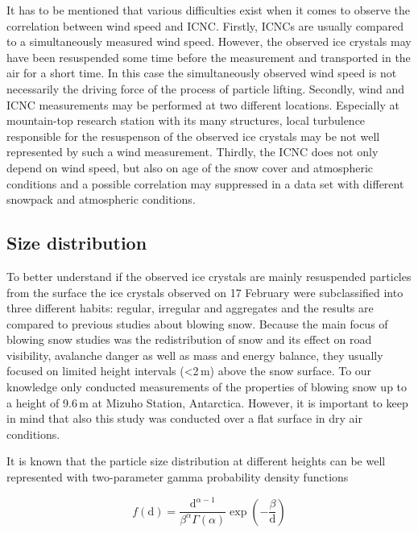 \documentclass[draft,linenumbers]{agujournal}
\begin{document}
It has to be mentioned that various difficulties exist when it comes to observe the correlation between wind speed and ICNC. Firstly, ICNCs are usually compared to a simultaneously measured wind speed. However, the observed ice crystals may have been resuspended some time before the measurement and transported in the air for a short time. In this case the simultaneously observed wind speed is not necessarily the driving force of the process of particle lifting. Secondly, wind and ICNC measurements may be performed at two different locations. Especially at mountain-top research station with its many structures, local turbulence responsible for the resuspenson of the observed ice crystals may be not well represented by such a wind measurement. Thirdly, the ICNC does not only depend on wind speed, but also on age of the snow cover and atmospheric conditions and a possible correlation may suppressed in a data set with different snowpack and atmospheric conditions.

\subsection{Size distribution}
To better understand if the observed ice crystals are mainly resuspended particles from the surface the ice crystals observed on 17 February were subclassified into three different habits: regular, irregular and aggregates and the results are compared to previous studies about blowing snow. Because the main focus of blowing snow studies was the redistribution of snow and its effect on road visibility, avalanche danger as well as mass and energy balance, they usually focused on limited height intervals (<2\,\si{m}) above the snow surface. To our knowledge only \citet{Nis05} conducted measurements of the properties of blowing snow up to a height of 9.6\,\si{m} at Mizuho Station, Antarctica. However, it is important to keep in mind that also this study was conducted over a flat surface in dry air conditions. 

It is known that the particle size distribution at different heights can be well represented with two-parameter gamma probability density functions \citep{Bud66, Sch82} 

\begin{linenomath*}
\begin{equation}
f(\text{d}) = \frac{\text{d}^{\alpha - 1}}{\beta^{\alpha} \Gamma\left(\alpha\right)}\exp\left(-\frac{\beta}{\text{d}}\right) 
\end{equation}
\end{linenomath*}
\end{document}
